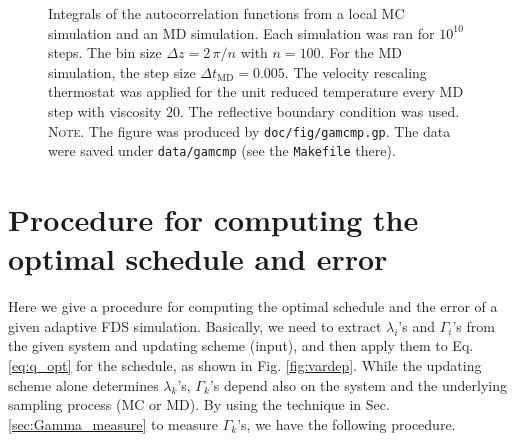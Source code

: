 \documentclass[reprint, superscriptaddress, floatfix]{revtex4-1}
\newcommand{\note}[1]{{\color{DarkGreen}\footnotesize \textsc{Note.} #1}}
\begin{document}
\begin{figure}[h]
\begin{center}
  \caption{
    \label{fig:gamcmp}
    Integrals of the autocorrelation functions
    from a local MC simulation
    and an MD simulation.
    Each simulation was ran for $10^{10}$ steps.
    The bin size $\Delta z = 2\, \pi /n$ with $n = 100$.
    For the MD simulation,
    the step size $\Delta t_\mathrm{MD} = 0.005$.
    The velocity rescaling thermostat\cite{bussi2007} was
    applied for the unit reduced temperature
    every MD step with viscosity $20$.
    The reflective boundary condition was used.
    \note{The figure was produced by \texttt{doc/fig/gamcmp.gp}.
      The data were saved under \texttt{data/gamcmp}
      (see the \texttt{Makefile} there).
    }%
  }
\end{center}
\end{figure}






\section{\label{sec:procedure}
Procedure for computing the optimal schedule and error
}


Here we give a procedure for computing
the optimal schedule and the error
of a given adaptive FDS simulation.
%
Basically, we need to extract
$\lambda_i$'s and $\Gamma_i$'s
from the given system and updating scheme (input),
and then apply them to Eq. \eqref{eq:q_opt}
for the schedule,
as shown in Fig. \ref{fig:vardep}.
%
%
While the updating scheme alone
determines $\lambda_k$'s,
$\Gamma_k$'s depend also on the system
and the underlying sampling process (MC or MD).
%
By using the technique in Sec. \ref{sec:Gamma_measure}
to measure $\Gamma_k$'s,
we have the following procedure.
\end{document}
